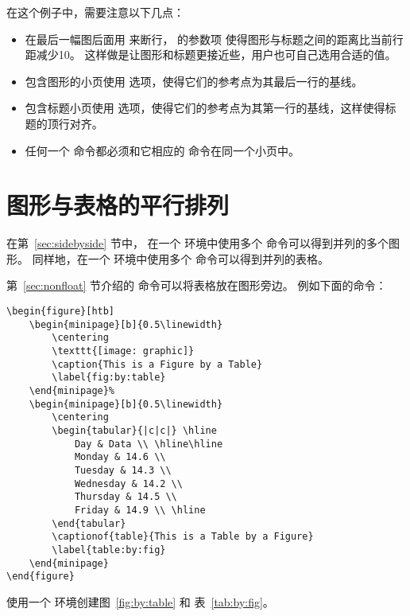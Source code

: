 在这个例子中，需要注意以下几点：
\begin{itemize}
	\item 在最后一幅图后面用 \cmd{\cmd{}} 来断行，
	\cmd{\cmd{}} 的参数项 \opt{[-10pt]} 使得图形与标题之间的距离比当前行距减少10\pt 。
	这样做是让图形和标题更接近些，用户也可自己选用合适的值。
	\item 包含图形的小页使用 \opt{[b]} 选项，使得它们的参考点为其最后一行的基线。
	\item 包含标题小页使用 \opt{[t]} 选项，使得它们的参考点为其第一行的基线，这样使得标题的顶行对齐。
	\item 任何一个  命令都必须和它相应的  命令在同一个小页中。
\end{itemize}


\section{图形与表格的平行排列}\label{sec:figuretable}

在第~\ref{sec:sidebyside} 节中，
在一个  环境中使用多个  命令可以得到并列的多个图形。
同样地，在一个  环境中使用多个  命令可以得到并列的表格。

第~\ref{sec:nonfloat} 节介绍的  命令可以将表格放在图形旁边。
例如下面的命令：
\begin{lstlisting}
\begin{figure}[htb]
	\begin{minipage}[b]{0.5\linewidth}
		\centering
		\texttt{[image: graphic]}
		\caption{This is a Figure by a Table}
		\label{fig:by:table}
	\end{minipage}%
	\begin{minipage}[b]{0.5\linewidth}
		\centering
		\begin{tabular}{|c|c|} \hline
			Day & Data \\ \hline\hline
			Monday & 14.6 \\
			Tuesday & 14.3 \\
			Wednesday & 14.2 \\
			Thursday & 14.5 \\
			Friday & 14.9 \\ \hline
		\end{tabular}
		\captionof{table}{This is a Table by a Figure}
		\label{table:by:fig}
	\end{minipage}
\end{figure}
\end{lstlisting}
使用一个  环境创建图~\ref{fig:by:table} 和 表~\ref{tab:by:fig}。

